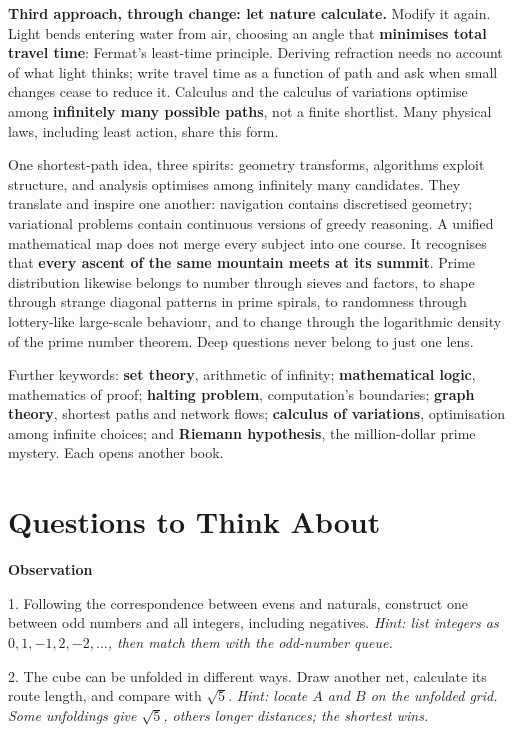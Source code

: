 \textbf{Third approach, through change: let nature calculate.} Modify it again. Light bends entering water from air, choosing an angle that \textbf{minimises total travel time}: Fermat's least-time principle. Deriving refraction needs no account of what light thinks; write travel time as a function of path and ask when small changes cease to reduce it. Calculus and the calculus of variations optimise among \textbf{infinitely many possible paths}, not a finite shortlist. Many physical laws, including least action, share this form.

One shortest-path idea, three spirits: geometry transforms, algorithms exploit structure, and analysis optimises among infinitely many candidates. They translate and inspire one another: navigation contains discretised geometry; variational problems contain continuous versions of greedy reasoning. A unified mathematical map does not merge every subject into one course. It recognises that \textbf{every ascent of the same mountain meets at its summit}. Prime distribution likewise belongs to number through sieves and factors, to shape through strange diagonal patterns in prime spirals, to randomness through lottery-like large-scale behaviour, and to change through the logarithmic density of the prime number theorem. Deep questions never belong to just one lens.

\begin{pandeng}
Further keywords: \textbf{set theory}, arithmetic of infinity; \textbf{mathematical logic}, mathematics of proof; \textbf{halting problem}, computation's boundaries; \textbf{graph theory}, shortest paths and network flows; \textbf{calculus of variations}, optimisation among infinite choices; and \textbf{Riemann hypothesis}, the million-dollar prime mystery. Each opens another book.
\end{pandeng}

\section*{Questions to Think About}

\textbf{Observation}

1. Following the correspondence between evens and naturals, construct one between odd numbers and all integers, including negatives. \emph{Hint: list integers as $0, 1, -1, 2, -2, \ldots$, then match them with the odd-number queue.}

2. The cube can be unfolded in different ways. Draw another net, calculate its route length, and compare with $\sqrt{5}$. \emph{Hint: locate $A$ and $B$ on the unfolded grid. Some unfoldings give $\sqrt{5}$, others longer distances; the shortest wins.}

